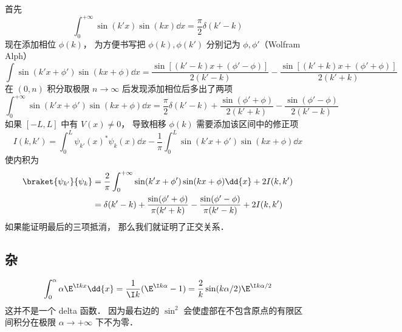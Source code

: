 首先
\begin{equation}
\int_{0}^{+\infty} \sin(k'x)\sin(kx)\dd{x} = \frac{\pi}{2}\delta(k'-k)
\end{equation}
现在添加相位 $\phi(k)$， 为方便书写把 $\phi(k),\phi(k')$ 分别记为 $\phi, \phi'$（Wolfram Alph）
\begin{equation}
\int \sin(k'x+\phi')\sin(kx+\phi) \dd{x} = \frac{\sin[(k'-k)x + (\phi'-\phi)]}{2(k'-k)}
- \frac{\sin[(k'+k)x+(\phi'+\phi)]}{2(k'+k)}
\end{equation}
在 $(0,n)$ 积分取极限 $n\to\infty$ 后发现添加相位后多出了两项
\begin{equation}
\int_{0}^{+\infty} \sin(k'x+\phi')\sin(kx+\phi) \dd{x} = \frac{\pi}{2}\delta(k'-k)
+ \frac{\sin(\phi'+\phi)}{2(k'+k)} - \frac{\sin(\phi'-\phi)}{2(k'-k)}
\end{equation}
如果 $[-L,L]$ 中有 $V(x) \ne 0$， 导致相移 $\phi(k)$ 需要添加该区间中的修正项
\begin{equation}
I(k,k') = \int_0^L \psi_{k'}(x)^* \psi_k(x) \dd{x}
-\frac{1}{\pi}\int_{0}^{L} \sin(k'x+\phi')\sin(kx+\phi) \dd{x}
\end{equation}
使内积为
\begin{equation}
\begin{aligned}
\braket{\psi_{k'}}{\psi_k} &= \frac{2}{\pi}\int_{0}^{+\infty} \sin(k'x+\phi')\sin(kx+\phi) \dd{x} + 2I(k,k')\\
&= \delta(k'-k) + \frac{\sin(\phi'+\phi)}{\pi(k'+k)} - \frac{\sin(\phi'-\phi)}{\pi(k'-k)} + 2I(k,k')
\end{aligned}
\end{equation}
如果能证明最后的三项抵消， 那么我们就证明了正交关系．

\subsection{杂}
\begin{equation}
\int_0^\alpha\alpha \E^{\I kx} \dd{x} = \frac{1}{\I k} (\E^{\I k\alpha} - 1)
= \frac{2}{ k} \sin(k\alpha/2) \E^{\I k\alpha/2}
\end{equation}
这并不是一个 delta 函数． 因为最右边的 $\sin^2$ 会使虚部在不包含原点的有限区间积分在极限 $\alpha \to +\infty$ 下不为零．
